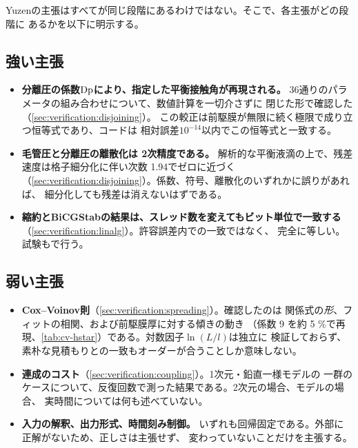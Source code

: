 Yuzenの主張はすべてが同じ段階にあるわけではない。そこで、各主張がどの段階に
あるかを以下に明示する。

\subsection*{強い主張}

\begin{itemize}
  \item \textbf{分離圧の係数$\mathrm{Dp}$により、指定した平衡接触角が再現される。}
    36通りのパラメータの組み合わせについて、数値計算を一切介さずに
    閉じた形で確認した（\cref{sec:verification:disjoining}）。
    この較正は前駆膜が無限に続く極限で成り立つ恒等式であり、コードは
    相対誤差$10^{-14}$以内でこの恒等式と一致する。
  \item \textbf{毛管圧と分離圧の離散化は 2次精度である。}
    解析的な平衡液滴の上で、残差速度は格子細分化に伴い次数 1.94でゼロに近づく
    （\cref{sec:verification:disjoining}）。係数、符号、離散化のいずれかに誤りがあれば、
    細分化しても残差は消えないはずである。
  \item \textbf{縮約とBiCGStabの結果は、スレッド数を変えてもビット単位で一致する}
    （\cref{sec:verification:linalg}）。許容誤差内での一致ではなく、
    完全に等しい。試験も\code{==}で行う。
\end{itemize}

\subsection*{弱い主張}

\begin{itemize}
  \item \textbf{Cox--Voinov則}（\cref{sec:verification:spreading}）。確認したのは
    関係式の\emph{形}、フィットの相関、および前駆膜厚に対する傾きの動き
    （係数 9 を約 5 \%で再現、\cref{tab:cv-hstar}）である。対数因子$\ln(L/l)$は独立に
    検証しておらず、素朴な見積もりとの一致もオーダーが合うことしか意味しない。
  \item \textbf{連成のコスト}（\cref{sec:verification:coupling}）。1次元・鉛直一様モデルの
    一群のケースについて、反復回数で測った結果である。2次元の場合、モデルの場合、
    実時間については何も述べていない。
  \item \textbf{入力の解釈、出力形式、時間刻み制御。}
    いずれも回帰固定である。外部に正解がないため、正しさは主張せず、
    変わっていないことだけを主張する。
\end{itemize}

